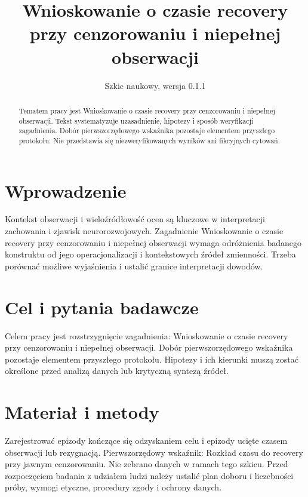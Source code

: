 \documentclass[11pt,a4paper]{article}
\title{Wnioskowanie o czasie recovery przy cenzorowaniu i niepełnej obserwacji}
\author{}
\date{Szkic naukowy, wersja 0.1.1}
\begin{document}
\maketitle

\begin{abstract}

Tematem pracy jest Wnioskowanie o czasie recovery przy cenzorowaniu i niepełnej obserwacji. Tekst systematyzuje uzasadnienie, hipotezy i sposób weryfikacji zagadnienia. Dobór pierwszorzędowego wskaźnika pozostaje elementem przyszłego protokołu. Nie przedstawia się niezweryfikowanych wyników ani fikcyjnych cytowań.

\end{abstract}

\section{Wprowadzenie}

Kontekst obserwacji i wieloźródłowość ocen są kluczowe w interpretacji zachowania i zjawisk neurorozwojowych. Zagadnienie Wnioskowanie o czasie recovery przy cenzorowaniu i niepełnej obserwacji wymaga odróżnienia badanego konstruktu od jego operacjonalizacji i kontekstowych źródeł zmienności. Trzeba porównać możliwe wyjaśnienia i ustalić granice interpretacji dowodów.

\section{Cel i pytania badawcze}

Celem pracy jest rozstrzygnięcie zagadnienia: Wnioskowanie o czasie recovery przy cenzorowaniu i niepełnej obserwacji. Dobór pierwszorzędowego wskaźnika pozostaje elementem przyszłego protokołu. Hipotezy i ich kierunki muszą zostać określone przed analizą danych lub krytyczną syntezą źródeł.

\section{Materiał i metody}

Zarejestrować epizody kończące się odzyskaniem celu i epizody ucięte czasem obserwacji lub rezygnacją. Pierwszorzędowy wskaźnik: Rozkład czasu do recovery przy jawnym cenzorowaniu. Nie zebrano danych w ramach tego szkicu. Przed rozpoczęciem badania z udziałem ludzi należy ustalić plan doboru i liczebności próby, wymogi etyczne, procedury zgody i ochrony danych.
\end{document}
